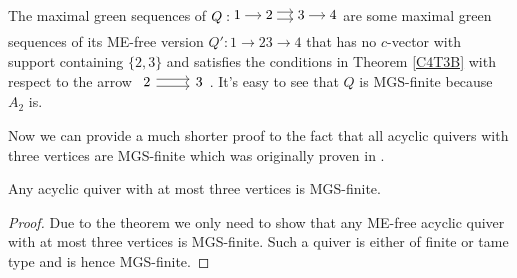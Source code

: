 \begin{example}
The maximal green sequences of $Q: \begin{tikzcd}[cramped, sep=small]
1\arrow[r] & 2 \rightdoublearrow&  3 \arrow[r] & 4\\
\end{tikzcd}$ are some maximal green sequences of its ME-free version $Q':1\to 2$\quad$3\to 4$ %
that has no $c$-vector with support containing $\{2,3\}$ and satisfies the conditions in Theorem \ref{C4T3B} with respect to the arrow $\begin{tikzcd} 2\rightdoublearrow & 3\end{tikzcd}$. It's easy to see that $Q$ is MGS-finite because $A_2$ is.
\end{example}
\indent Now we can provide a much shorter proof to the fact that all acyclic quivers with three vertices are MGS-finite which was originally proven in \cite{BDP13}.
\begin{corollary}
Any acyclic quiver with at most three vertices is MGS-finite.
\end{corollary}
\begin{proof}
Due to the theorem we only need to show that any ME-free acyclic quiver with at most three vertices is MGS-finite. Such a quiver is either of finite or tame type and is hence MGS-finite.
\end{proof}
